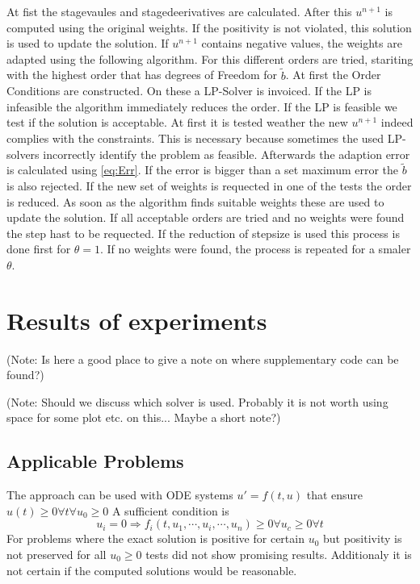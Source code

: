 \documentclass[a4paper]{article}
\numberwithin{equation}{section}
\theoremstyle{plain}
\theoremstyle{definition}
\numberwithin{theorem}{section}
\newcommand{\1}{\mathbbm{1}}
\begin{document}
At fist the stagevaules and stagedeerivatives are calculated.
After this $u^{n+1}$ is computed using the original weights. If the positivity is not violated, this solution is used to update the solution. 
If $u^{n+1}$ contains negative values, the weights are adapted using the following algorithm.
For this different orders are tried, stariting with the highest order that has degrees of Freedom for $\tilde{b}$. 
At first the Order Conditions are constructed. On these a LP-Solver is invoiced. If the LP is infeasible the algorithm immediately reduces the order. If the LP is feasible we test if the solution is acceptable. At first it is tested weather the new $u^{n+1}$ indeed complies with the constraints. This is necessary because sometimes the used LP-solvers incorrectly identify the problem as feasible. %
Afterwards the adaption error is calculated using \eqref{eq:Err}. If the error is bigger than a set maximum error the $\tilde{b}$ is also rejected.
If the new set of weights is requected in one of the tests the order is reduced.
As soon as the algorithm finds suitable weights these are used to update the solution.
If all acceptable orders are tried and no weights were found the step hast to be requected.
If the reduction of stepsize is used this process is done first for $\theta = 1$. If no weights were found, the process is repeated for a smaler $\theta$. 



\section{Results of experiments}\label{sec:Numeric_Results}

(Note: Is here a good place to give a note on where supplementary code can be found?)

(Note: Should we discuss which solver is used. Probably it is not worth using space for some plot etc. on this... Maybe a short note?)

\subsection{Applicable Problems}\label{sec:app_problem}
The approach can be used with ODE systems $u' = f(t,u)$ that ensure  $u(t) \geq 0 \forall t \forall {  u_0 \geq 0}$ 
A sufficient condition is  
\begin{equation}
u_i=0 \Rightarrow f_i(t,u_1,\cdots,u_i,\cdots,u_n) \geq 0  \forall {u_c \geq 0} \forall {t}
\end{equation}
For problems where the exact solution is positive for certain $u_0$ but positivity is not preserved for all $u_0 \geq 0$ tests did not show promising results. Additionaly it is not certain if the computed solutions would be reasonable.
\end{document}
